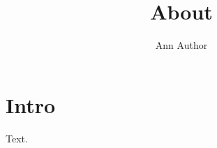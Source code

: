 \documentclass{article}
\title{About \nm}
\author{Ann Author}
\begin{document}
\begin{center}\end{center}
\maketitle
\section{Intro}
Text.
\end{document}
